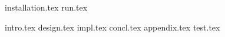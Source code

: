 \documentclass[a4paper,10pt]{article}
\begin{document}
\maketitle
\tableofcontents
\newpage

{installation.tex}
{run.tex}

{intro.tex}
{design.tex}
{impl.tex}
{concl.tex}
{appendix.tex}
{test.tex}

\end{document}
